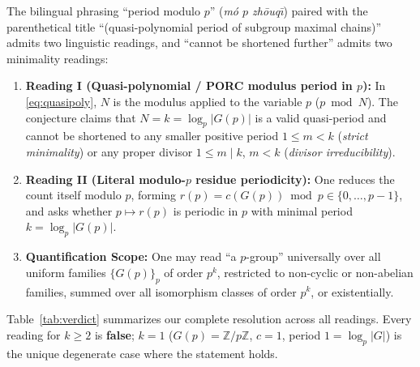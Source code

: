 \documentclass[11pt,a4paper]{article}
\theoremstyle{definition}
\begin{document}
The bilingual phrasing ``period modulo $p$'' (\emph{m\'o $p$ zh\=ouq\=\i}) paired with the parenthetical title ``(quasi-polynomial period of subgroup maximal chains)'' admits two linguistic readings, and ``cannot be shortened further'' admits two minimality readings:
\begin{enumerate}
  \item \textbf{Reading I (Quasi-polynomial / PORC modulus period in $p$):} In \eqref{eq:quasipoly}, $N$ is the modulus applied to the variable $p$ ($p \bmod N$). The conjecture claims that $N = k = \log_p |G(p)|$ is a valid quasi-period and cannot be shortened to any smaller positive period $1 \le m < k$ (\emph{strict minimality}) or any proper divisor $1 \le m \mid k$, $m < k$ (\emph{divisor irreducibility}).
  \item \textbf{Reading II (Literal modulo-$p$ residue periodicity):} One reduces the count itself modulo $p$, forming $r(p) = c(G(p)) \bmod p \in \{0, \dots, p-1\}$, and asks whether $p \mapsto r(p)$ is periodic in $p$ with minimal period $k = \log_p |G(p)|$.
  \item \textbf{Quantification Scope:} One may read ``a $p$-group'' universally over all uniform families $\{G(p)\}_p$ of order $p^k$, restricted to non-cyclic or non-abelian families, summed over all isomorphism classes of order $p^k$, or existentially.
\end{enumerate}

Table~\ref{tab:verdict} summarizes our complete resolution across all readings. Every reading for $k \ge 2$ is \textbf{false}; $k = 1$ ($G(p) = \mathbb{Z}/p\mathbb{Z}$, $c = 1$, period $1 = \log_p |G|$) is the unique degenerate case where the statement holds.
\end{document}
